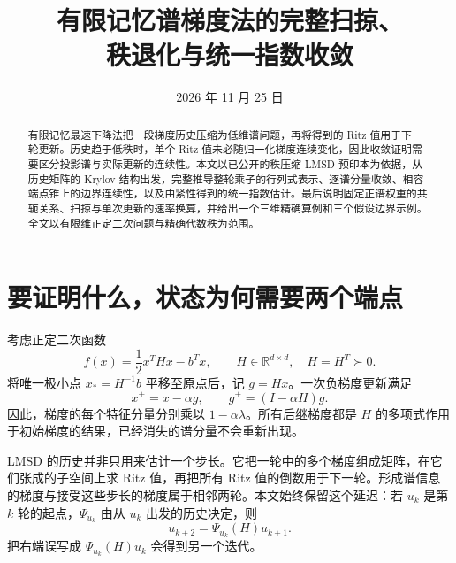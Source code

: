\documentclass[UTF8,zihao=-4,a4paper]{ctexart}
\title{\bfseries 有限记忆谱梯度法的完整扫掠、\\秩退化与统一指数收敛}
\author{}\date{2026 年 11 月 25 日}
\theoremstyle{definition}\newtheorem{example}[theorem]{例}
\newcommand{\R}{\mathbb R}\newcommand{\N}{\mathbb N}
\begin{document}
\maketitle
\begin{abstract}
有限记忆最速下降法把一段梯度历史压缩为低维谱问题，再将得到的 Ritz 值用于下一轮更新。历史趋于低秩时，单个 Ritz 值未必随归一化梯度连续变化，因此收敛证明需要区分投影谱与实际更新的连续性。本文以已公开的秩压缩 LMSD 预印本为依据，从历史矩阵的 Krylov 结构出发，完整推导整轮乘子的行列式表示、逐谱分量收敛、相容端点锥上的边界连续性，以及由紧性得到的统一指数估计。最后说明固定正谱权重的共轭关系、扫掠与单次更新的速率换算，并给出一个三维精确算例和三个假设边界示例。全文以有限维正定二次问题与精确代数秩为范围。
\end{abstract}
\tableofcontents

\section{要证明什么，状态为何需要两个端点}

考虑正定二次函数
\begin{equation}\label{eq:model}
 f(x)=\frac12x^THx-b^Tx,\qquad H\in\R^{d\times d},\quad H=H^T\succ0.
\end{equation}
将唯一极小点 $x_*=H^{-1}b$ 平移至原点后，记 $g=Hx$。一次负梯度更新满足
\begin{equation}\label{eq:step}
 x^+=x-\alpha g,\qquad g^+=(I-\alpha H)g.
\end{equation}
因此，梯度的每个特征分量分别乘以 $1-\alpha\lambda$。所有后继梯度都是 $H$ 的多项式作用于初始梯度的结果，已经消失的谱分量不会重新出现。

LMSD 的历史并非只用来估计一个步长。它把一轮中的多个梯度组成矩阵，在它们张成的子空间上求 Ritz 值，再把所有 Ritz 值的倒数用于下一轮。形成谱信息的梯度与接受这些步长的梯度属于相邻两轮。本文始终保留这个延迟：若 $u_k$ 是第 $k$ 轮的起点，$\Psi_{u_k}$ 由从 $u_k$ 出发的历史决定，则
\begin{equation}\label{eq:delay}
 u_{k+2}=\Psi_{u_k}(H)u_{k+1}.
\end{equation}
把右端误写成 $\Psi_{u_k}(H)u_k$ 会得到另一个迭代。
\end{document}
